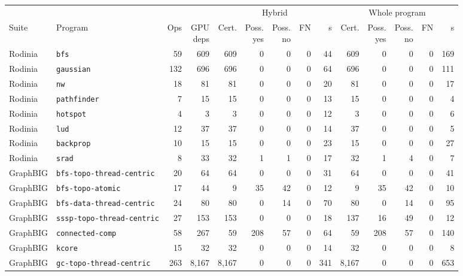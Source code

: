 \begin{tabular}{llrr|rrrrr|rrrrr}
\toprule
 & & & & \multicolumn{5}{c|}{Hybrid} & \multicolumn{5}{c}{Whole program} \\
Suite & Program & Ops & \shortstack{GPU\\deps} & Cert. & \shortstack{Poss.\\yes} & \shortstack{Poss.\\no} & FN & s & Cert. & \shortstack{Poss.\\yes} & \shortstack{Poss.\\no} & FN & s \\
\midrule
Rodinia & \texttt{bfs} & 59 & 609 & 609 & 0 & 0 & 0 & 44 & 609 & 0 & 0 & 0 & 169 \\
Rodinia & \texttt{gaussian} & 132 & 696 & 696 & 0 & 0 & 0 & 64 & 696 & 0 & 0 & 0 & 111 \\
Rodinia & \texttt{nw} & 18 & 81 & 81 & 0 & 0 & 0 & 20 & 81 & 0 & 0 & 0 & 17 \\
Rodinia & \texttt{pathfinder} & 7 & 15 & 15 & 0 & 0 & 0 & 13 & 15 & 0 & 0 & 0 & 4 \\
Rodinia & \texttt{hotspot} & 4 & 3 & 3 & 0 & 0 & 0 & 12 & 3 & 0 & 0 & 0 & 6 \\
Rodinia & \texttt{lud} & 12 & 37 & 37 & 0 & 0 & 0 & 14 & 37 & 0 & 0 & 0 & 5 \\
Rodinia & \texttt{backprop} & 10 & 15 & 15 & 0 & 0 & 0 & 23 & 15 & 0 & 0 & 0 & 27 \\
Rodinia & \texttt{srad} & 8 & 33 & 32 & 1 & 1 & 0 & 17 & 32 & 1 & 4 & 0 & 7 \\
\midrule
GraphBIG & \texttt{bfs-topo-thread-centric} & 20 & 64 & 64 & 0 & 0 & 0 & 31 & 64 & 0 & 0 & 0 & 41 \\
GraphBIG & \texttt{bfs-topo-atomic} & 17 & 44 & 9 & 35 & 42 & 0 & 12 & 9 & 35 & 42 & 0 & 10 \\
GraphBIG & \texttt{bfs-data-thread-centric} & 24 & 80 & 80 & 0 & 14 & 0 & 70 & 80 & 0 & 14 & 0 & 95 \\
GraphBIG & \texttt{sssp-topo-thread-centric} & 27 & 153 & 153 & 0 & 0 & 0 & 18 & 137 & 16 & 49 & 0 & 12 \\
GraphBIG & \texttt{connected-comp} & 58 & 267 & 59 & 208 & 57 & 0 & 64 & 59 & 208 & 57 & 0 & 140 \\
GraphBIG & \texttt{kcore} & 15 & 32 & 32 & 0 & 0 & 0 & 14 & 32 & 0 & 0 & 0 & 8 \\
GraphBIG & \texttt{gc-topo-thread-centric} & 263 & 8,167 & 8,167 & 0 & 0 & 0 & 341 & 8,167 & 0 & 0 & 0 & 653 \\

\end{tabular}
